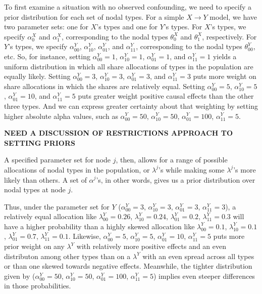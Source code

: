 \documentclass[12pt,]{book}
\begin{document}
To first examine a situation with no observed confounding, we need to specify a prior distribution for each set of nodal types. For a simple \(X \rightarrow Y\) model, we have two parameter sets: one for \(X\)'s types and one for \(Y\)'s types. For \(X\)'s types, we specify \(\alpha^X_0\) and \(\alpha^X_1\), corresponding to the nodal types \(\theta^X_0\) and \(\theta^X_1\), respectively. For \(Y\)'s types, we specify \(\alpha^Y_{00}\), \(\alpha^Y_{10}\), \(\alpha^Y_{01}\), and \(\alpha^Y_{11}\), corresponding to the nodal types \(\theta^Y_{00}\), etc. So, for instance, setting \(\alpha^Y_{00}=1\), \(\alpha^Y_{10}=1\), \(\alpha^Y_{01}=1\), and \(\alpha^Y_{11}=1\) yields a uniform distribution in which all share allocations of types in the population are equally likely. Setting \(\alpha^Y_{00}=3\), \(\alpha^Y_{10}=3\), \(\alpha^Y_{01}=3\), and \(\alpha^Y_{11}=3\) puts more weight on share allocations in which the shares are relatively equal. Setting \(\alpha^Y_{00}=5\), \(\alpha^Y_{10}=5\), \(\alpha^Y_{01}=10\), and \(\alpha^Y_{11}=5\) puts greater weight positive causal effects than the other three types. And we can express greater certainty about that weighting by setting higher absolute alpha values, such as \(\alpha^Y_{00}=50\), \(\alpha^Y_{10}=50\), \(\alpha^Y_{01}=100\), \(\alpha^Y_{11}=5\).

\textbf{NEED A DISCUSSION OF RESTRICTIONS APPROACH TO SETTING PRIORS}

A specified parameter set for node \(j\), then, allows for a range of possible allocations of nodal types in the population, or \(\lambda^j\)'s while making some \(\lambda^j\)'s more likely than others. A set of \(\alpha^j\)'s, in other words, gives us a prior distribution over nodal types at node \(j\).

Thus, under the parameter set for \(Y\) (\(\alpha^Y_{00}=3\), \(\alpha^Y_{10}=3\), \(\alpha^Y_{01}=3\), \(\alpha^Y_{11}=3\)), a relatively equal allocation like \(\lambda^Y_{00}=0.26\), \(\lambda^Y_{10}=0.24\), \(\lambda^Y_{01}=0.2\), \(\lambda^Y_{11}=0.3\) will have a higher probability than a highly skewed allocation like \(\lambda^Y_{00}=0.1\), \(\lambda^Y_{10}=0.1\), \(\lambda^Y_{01}=0.7\), \(\lambda^Y_{11}=0.1\). Likewise, \(\alpha^Y_{00}=5\), \(\alpha^Y_{10}=5\), \(\alpha^Y_{01}=10\), \(\alpha^Y_{11}=5\) puts more prior weight on any \(\lambda^Y\) with relatively more positive effects and an even distributon among other types than on a \(\lambda^Y\) with an even spread across all types or than one skewed towards negative effects. Meanwhile, the tighter distribution given by (\(\alpha^Y_{00}=50\), \(\alpha^Y_{10}=50\), \(\alpha^Y_{01}=100\), \(\alpha^Y_{11}=5\)) implies even steeper differences in those probabilities.
\end{document}
